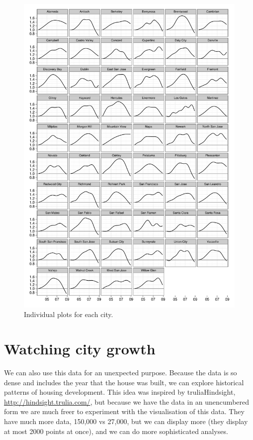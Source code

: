 \documentclass[oneside]{article}
\begin{document}
\begin{figure}[htbp]
  \centering
  \includegraphics[width=0.9\linewidth]{cities-individual}
  \caption{Individual plots for each city.}
  \label{fig:individual}
\end{figure}

\section{Watching city growth}

We can also use this data for an unexpected purpose.  Because the data is so dense and includes the year that the house was built, we can explore historical patterns of housing development.  This idea was inspired by truliaHindsight, \url{http://hindsight.trulia.com/}, but because we have the data in an unencumbered form we are much freer to experiment with the visualisation of this data.  They have much more data, 150,000 vs 27,000, but we can display more (they display at most 2000 points at once), and we can do more sophisticated analyses.
\end{document}
